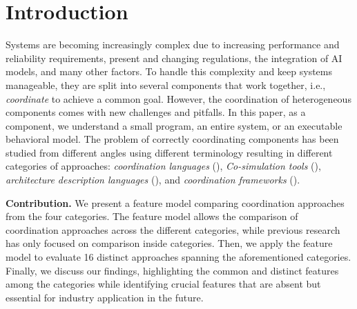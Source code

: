 \documentclass[runningheads]{llncs}
\begin{document}
\section{Introduction} \label{sec:introduction}
Systems are becoming increasingly complex due to increasing performance and reliability requirements, present and changing regulations, the integration of AI models, and many other factors.
To handle this complexity and keep systems manageable, they are split into several components that work together, i.e., \textit{coordinate} to achieve a common goal.
However, the coordination of heterogeneous components comes with new challenges and pitfalls.
In this paper, as a component, we understand a small program, an entire system, or an executable behavioral model.
The problem of correctly coordinating components has been studied from different angles using different terminology resulting in different categories of approaches: \textit{coordination languages} (\cite{papadopoulosCoordinationModelsLanguages1998}), \textit{Co-simulation tools} (\cite{gomesCoSimulationSurvey2019}), \textit{architecture description languages} (\cite{clementsSurveyArchitectureDescription1996}), and \textit{coordination frameworks} (\cite{krauterBehavioralConsistencyMultimodeling2023,varalarsenBehavioralCoordinationOperator2015}).

\textbf{Contribution.} We present a feature model comparing coordination approaches from the four categories.
The feature model allows the comparison of coordination approaches across the different categories, while previous research has only focused on comparison inside categories. 
Then, we apply the feature model to evaluate 16 distinct approaches spanning the aforementioned categories.
Finally, we discuss our findings, highlighting the common and distinct features among the categories while identifying crucial features that are absent but essential for industry application in the future.

\end{document}
